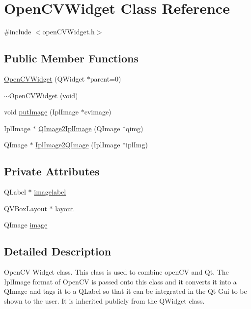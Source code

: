 \hypertarget{classOpenCVWidget}{
\section{OpenCVWidget Class Reference}
\label{classOpenCVWidget}
}


{\ttfamily \#include $<$openCVWidget.h$>$}

\subsection*{Public Member Functions}
\begin{DoxyCompactItemize}
\item 
\hyperlink{classOpenCVWidget_abae2420f4043f52fa370f48a2d067613}{OpenCVWidget} (QWidget $\ast$parent=0)
\item 
\hyperlink{classOpenCVWidget_ab9c699a779b06c50f03baf2f9044d40a}{$\sim$OpenCVWidget} (void)
\item 
void \hyperlink{classOpenCVWidget_a606f158ae31d544aeaebf62eaa4c5578}{putImage} (IplImage $\ast$cvimage)
\item 
IplImage $\ast$ \hyperlink{classOpenCVWidget_aa810d1ba38622b3ede548c5c05c09d4b}{QImage2IplImage} (QImage $\ast$qimg)
\item 
QImage $\ast$ \hyperlink{classOpenCVWidget_af99b8e4ebea0ee0253de42b6b0b0c564}{IplImage2QImage} (IplImage $\ast$iplImg)
\end{DoxyCompactItemize}
\subsection*{Private Attributes}
\begin{DoxyCompactItemize}
\item 
QLabel $\ast$ \hyperlink{classOpenCVWidget_afee1a5f25e6e5072aad2cffdc155a3a0}{imagelabel}
\item 
QVBoxLayout $\ast$ \hyperlink{classOpenCVWidget_afc95cfbd7dc35fe7d1ddb7aeceb0d6ae}{layout}
\item 
QImage \hyperlink{classOpenCVWidget_a943bdf3d872bc531e759f210f301f1f9}{image}
\end{DoxyCompactItemize}


\subsection{Detailed Description}
OpenCV Widget class. This class is used to combine openCV and Qt. The IplImage format of OpenCV is passed onto this class and it converts it into a QImage and tags it to a QLabel so that it can be integrated in the Qt Gui to be shown to the user. It is inherited publicly from the QWidget class. 

